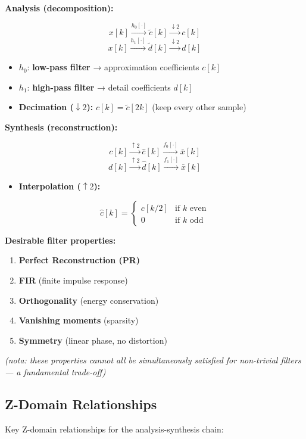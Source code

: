 \textbf{Analysis (decomposition):}

\[
x[k] \xrightarrow{h_0[\cdot]} \tilde{c}[k] \xrightarrow{\downarrow 2} c[k]
\]
\[
x[k] \xrightarrow{h_1[\cdot]} \tilde{d}[k] \xrightarrow{\downarrow 2} d[k]
\]

\begin{itemize}
\item $h_0$: \textbf{low-pass filter} → approximation coefficients $c[k]$
\item $h_1$: \textbf{high-pass filter} → detail coefficients $d[k]$
\item \textbf{Decimation ($\downarrow 2$):} $c[k] = \tilde{c}[2k]$ (keep every other sample)
\end{itemize}

\textbf{Synthesis (reconstruction):}

\[
c[k] \xrightarrow{\uparrow 2} \hat{c}[k] \xrightarrow{f_0[\cdot]} \bar{x}[k]
\]
\[
d[k] \xrightarrow{\uparrow 2} \hat{d}[k] \xrightarrow{f_1[\cdot]} \bar{x}[k]
\]

\begin{itemize}
\item \textbf{Interpolation ($\uparrow 2$):}
\end{itemize}
\[
\hat{c}[k] = \begin{cases} c[k/2] & \text{if } k \text{ even} \\ 0 & \text{if } k \text{ odd} \end{cases}
\]

\textbf{Desirable filter properties:}
\begin{enumerate}
\item \textbf{Perfect Reconstruction (PR)}
\item \textbf{FIR} (finite impulse response)
\item \textbf{Orthogonality} (energy conservation)
\item \textbf{Vanishing moments} (sparsity)
\item \textbf{Symmetry} (linear phase, no distortion)
\end{enumerate}

\textit{(nota: these properties cannot all be simultaneously satisfied for non-trivial filters — a fundamental trade-off)}

\subsection{Z-Domain Relationships}

Key Z-domain relationships for the analysis-synthesis chain:

